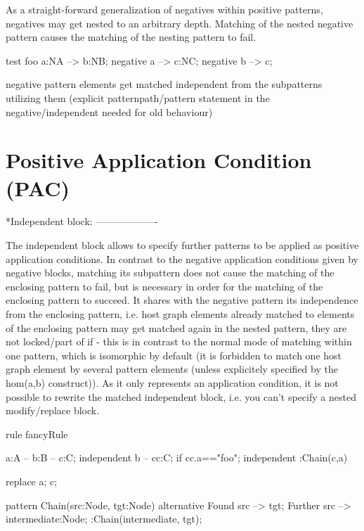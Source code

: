 As a straight-forward generalization of negatives within positive patterns,
negatives may get nested to an arbitrary depth. Matching of the nested
negative pattern causes the matching of the nesting pattern to fail.

\begin{example}
  \begin{grgen}
test foo {
  a:NA --> b:NB;
  negative {
    a --> c:NC;
    negative {
      b --> c;
    }
  }
}
  \end{grgen}
\end{example}

   negative pattern elements get matched independent from the subpatterns utilizing them
	(explicit patternpath/pattern statement in the negative/independent needed for old behaviour)

	
\section{Positive Application Condition (PAC)}
 \label{pac}
  
*Independent block:
-------------------

The independent block allows to specify further patterns 
to be applied as positive application conditions.
In contrast to the negative application conditions given by negative blocks,
matching its subpattern does not cause the matching of the enclosing pattern 
to fail, but is necessary in order for the matching of the enclosing pattern
to succeed. It shares with the negative pattern its independence from the 
enclosing pattern, i.e. host graph elements already matched to elements of the
enclosing pattern may get matched again in the nested pattern, they are not
locked/part of if - this is in contrast to the normal mode of matching within
one pattern, which is isomorphic by default (it is forbidden to match one 
host graph element by several pattern elements (unless explicitely specified 
by the hom(a,b) construct)). As it only represents an application condition,
it is not possible to rewrite the matched independent block,
i.e. you can't specify a nested modify/replace block.

\begin{example}
  \begin{grgen}

rule fancyRule
{
  a:A -- b:B -- c:C;
  independent {
    b -- cc:C;
	if { cc.a=="foo"; }
  }
  independent {
    :Chain(c,a)
  }
  
  replace {
    a; c;
  }
}

pattern Chain(src:Node, tgt:Node)
{
  alternative {
    Found {
	  src --> tgt;
    }
    Further {
      src --> intermediate:Node;
      :Chain(intermediate, tgt);
    }
  }
}
  \end{grgen}
\end{example}

